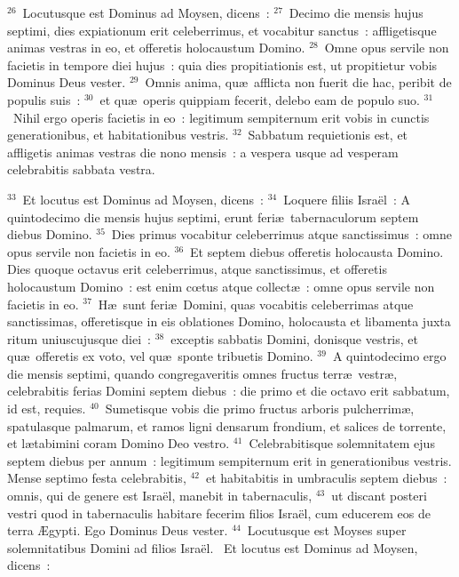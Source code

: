 ${}^{26}$~Locutusque est Dominus ad Moysen, dicens~:
${}^{27}$~Decimo die mensis hujus septimi, dies expiationum erit celeberrimus, et vocabitur sanctus~: affligetisque animas vestras in eo, et offeretis holocaustum Domino.
${}^{28}$~Omne opus servile non facietis in tempore diei hujus~: quia dies propitiationis est, ut propitietur vobis Dominus Deus vester.
${}^{29}$~Omnis anima, qu\ae\ afflicta non fuerit die hac, peribit de populis suis~:
${}^{30}$~et qu\ae\ operis quippiam fecerit, delebo eam de populo suo.
${}^{31}$~Nihil ergo operis facietis in eo~: legitimum sempiternum erit vobis in cunctis generationibus, et habitationibus vestris.
${}^{32}$~Sabbatum requietionis est, et affligetis animas vestras die nono mensis~: a vespera usque ad vesperam celebrabitis sabbata vestra.


${}^{33}$~Et locutus est Dominus ad Moysen, dicens~:
${}^{34}$~Loquere filiis Isra\"el~: A quintodecimo die mensis hujus septimi, erunt feri\ae\ tabernaculorum septem diebus Domino.
${}^{35}$~Dies primus vocabitur celeberrimus atque sanctissimus~: omne opus servile non facietis in eo.
${}^{36}$~Et septem diebus offeretis holocausta Domino. Dies quoque octavus erit celeberrimus, atque sanctissimus, et offeretis holocaustum Domino~: est enim cœtus atque collect\ae~: omne opus servile non facietis in eo.
${}^{37}$~H\ae\ sunt feri\ae\ Domini, quas vocabitis celeberrimas atque sanctissimas, offeretisque in eis oblationes Domino, holocausta et libamenta juxta ritum uniuscujusque diei~:
${}^{38}$~exceptis sabbatis Domini, donisque vestris, et qu\ae\ offeretis ex voto, vel qu\ae\ sponte tribuetis Domino.
${}^{39}$~A quintodecimo ergo die mensis septimi, quando congregaveritis omnes fructus terr\ae\ vestr\ae , celebrabitis ferias Domini septem diebus~: die primo et die octavo erit sabbatum, id est, requies.
${}^{40}$~Sumetisque vobis die primo fructus arboris pulcherrim\ae , spatulasque palmarum, et ramos ligni densarum frondium, et salices de torrente, et l\ae tabimini coram Domino Deo vestro.
${}^{41}$~Celebrabitisque solemnitatem ejus septem diebus per annum~: legitimum sempiternum erit in generationibus vestris. Mense septimo festa celebrabitis,
${}^{42}$~et habitabitis in umbraculis septem diebus~: omnis, qui de genere est Isra\"el, manebit in tabernaculis,
${}^{43}$~ut discant posteri vestri quod in tabernaculis habitare fecerim filios Isra\"el, cum educerem eos de terra \AE gypti. Ego Dominus Deus vester.
${}^{44}$~Locutusque est Moyses super solemnitatibus Domini ad filios Isra\"el.
~Et locutus est Dominus ad Moysen, dicens~:

